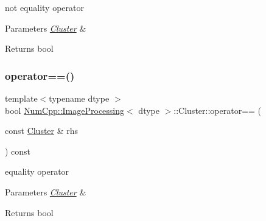 not equality operator


\begin{DoxyParams}{Parameters}
{\em \mbox{\hyperlink{class_num_cpp_1_1_image_processing_1_1_cluster}{Cluster}}} & \\
\hline
\end{DoxyParams}
\begin{DoxyReturn}{Returns}
bool 
\end{DoxyReturn}
\mbox{\label{class_num_cpp_1_1_image_processing_1_1_cluster_aa6de265ccddeda2db7a328e21cab030c}} 
\subsubsection{\texorpdfstring{operator==()}{operator==()}}
{\footnotesize\ttfamily template$<$typename dtype $>$ \\
bool \mbox{\hyperlink{class_num_cpp_1_1_image_processing}{Num\+Cpp\+::\+Image\+Processing}}$<$ dtype $>$\+::Cluster\+::operator== (\begin{DoxyParamCaption}\item[{const \mbox{\hyperlink{class_num_cpp_1_1_image_processing_1_1_cluster}{Cluster}} \&}]{rhs }\end{DoxyParamCaption}) const\hspace{0.3cm}{\ttfamily [inline]}}

equality operator


\begin{DoxyParams}{Parameters}
{\em \mbox{\hyperlink{class_num_cpp_1_1_image_processing_1_1_cluster}{Cluster}}} & \\
\hline
\end{DoxyParams}
\begin{DoxyReturn}{Returns}
bool 
\end{DoxyReturn}
\mbox{\label{class_num_cpp_1_1_image_processing_1_1_cluster_a6c7f0e8f7eebb136c9b672051eef6ce5}} 
